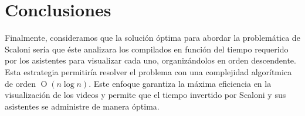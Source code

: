 \section{Conclusiones}

Finalmente, consideramos que la solución óptima para abordar la problemática de Scaloni sería que
éste analizara los compilados en función del tiempo requerido por los asistentes para vi\-sualizar
cada uno, organizándolos en orden descendente.
Esta estrategia permitiría resolver el problema con una complejidad algorítmica de orden 
$\operatorname{O}(n\log{n})$.
Este enfoque garantiza la máxima eficiencia en la visualización de los videos y permite que el 
tiempo invertido por Scaloni y sus asistentes se administre de manera óptima.
